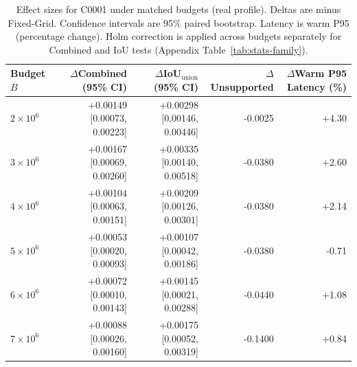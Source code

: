 \begin{table}[t]
  \caption{Effect sizes for C0001 under matched budgets (real profile). Deltas are \ProveTok minus Fixed-Grid. Confidence intervals are 95\% paired bootstrap. Latency is warm P95 (percentage change). Holm correction is applied across budgets separately for Combined and IoU tests (Appendix Table~\ref{tab:stats-family}).}
  \label{tab:effect-sizes}
  \centering
  \scriptsize
  \setlength{\tabcolsep}{4pt}
  \begin{tabular}{l r r r r}
    \toprule
    Budget $B$ & $\Delta$Combined (95\% CI) & $\Delta$IoU$_{\mathrm{union}}$ (95\% CI) & $\Delta$Unsupported & $\Delta$Warm P95 Latency (\%) \\
    \midrule
    $2{\times}10^6$ & +0.00149 [0.00073, 0.00223] & +0.00298 [0.00146, 0.00446] & -0.0025 & +4.30 \\
    $3{\times}10^6$ & +0.00167 [0.00069, 0.00260] & +0.00335 [0.00140, 0.00518] & -0.0380 & +2.60 \\
    $4{\times}10^6$ & +0.00104 [0.00063, 0.00151] & +0.00209 [0.00126, 0.00301] & -0.0380 & +2.14 \\
    $5{\times}10^6$ & +0.00053 [0.00020, 0.00093] & +0.00107 [0.00042, 0.00186] & -0.0380 & -0.71 \\
    $6{\times}10^6$ & +0.00072 [0.00010, 0.00143] & +0.00145 [0.00021, 0.00288] & -0.0440 & +1.08 \\
    $7{\times}10^6$ & +0.00088 [0.00026, 0.00160] & +0.00175 [0.00052, 0.00319] & -0.1400 & +0.84 \\
    \bottomrule
  \end{tabular}
\end{table}

